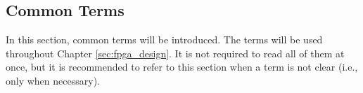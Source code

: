 \documentclass[a4paper, twoside]{report}
\theoremstyle{definition}
\numberwithin{equation}{section}
\begin{document}

\subsection{Common Terms}

In this section, common terms will be introduced.
The terms will be used throughout Chapter \ref{sec:fpga_design}.
It is not required to read all of them at once, but it is recommended to refer to this section
when a term is not clear (i.e., only when necessary).
\end{document}
